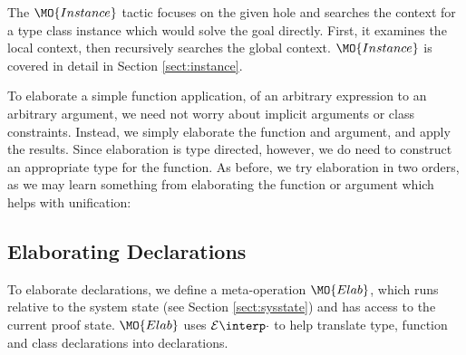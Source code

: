 The $\MO{Instance}$ tactic focuses on the given hole and searches the context for
a type class instance which would solve the goal directly. First, it examines the local
context, then recursively searches the global context. $\MO{Instance}$ is covered
in detail in Section \ref{sect:instance}.

To elaborate a simple function application, of an arbitrary expression to an arbitrary
argument, we need not worry about implicit arguments or class constraints. Instead,
we simply elaborate the function and argument, and apply the results. Since elaboration
is type directed, however, we do need to construct an appropriate type for the function.
As before, we try elaboration in two orders, as we may learn something from elaborating
the function or argument which helps with unification:




\subsection{Elaborating Declarations}

To elaborate declarations, we define a meta-operation $\MO{Elab}$, which runs
relative to the system state (see Section \ref{sect:sysstate}) and has access to the
current proof state. $\MO{Elab}$ uses $\ttinterp{\cdot}$ to help translate
\IdrisM{} type, function and class declarations into \TT{} declarations.

\newcommand{\edo}[1]{\RW{do}\:\AR{#1}}

